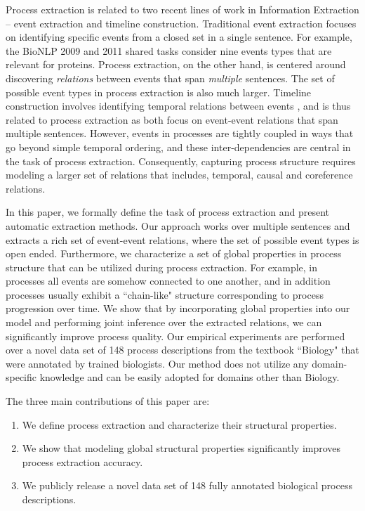 Process extraction is related to two recent lines of work in Information Extraction -- event extraction and timeline construction.
Traditional event extraction focuses on identifying specific events from a closed set in a single sentence. 
For example, the BioNLP 2009 and 2011 shared tasks \cite{kim09,kim11} consider nine events types that are relevant for proteins.
Process extraction, on the other hand, is centered around discovering \emph{relations} between events that span \emph{multiple} sentences. The set of possible event types in process extraction is also much larger. Timeline construction involves identifying temporal relations between events \cite{Chambers08,Yoshikawa09,Denis11,Do12,Mcclosky12}, and is thus related to process extraction as both focus on event-event relations that span multiple sentences. However, events in processes are tightly coupled in ways that go beyond simple temporal ordering, and these inter-dependencies are central in the task of process extraction. Consequently, capturing process structure requires modeling a larger set of relations that includes, temporal, causal and coreference relations.


In this paper, we formally define the task of process extraction and present automatic extraction methods. 
Our approach works over multiple sentences and extracts a rich set of event-event relations, where the set of possible event types is open ended. 
Furthermore, we characterize a set of global properties in process structure that can be utilized during process extraction. 
For example, in processes all events are somehow connected to one another, and in addition processes usually exhibit a ``chain-like" structure corresponding to process progression over time. 
We show that by incorporating global properties into our model and performing joint inference over the extracted relations, we can significantly improve process quality.  
Our empirical experiments are performed over a novel data set of 148 process descriptions from the textbook ``Biology" \cite{CampbellReece} that were annotated by trained biologists. Our method does not utilize any domain-specific knowledge and can be easily adopted for domains other than Biology.

The three main contributions of this paper are:
\begin{enumerate}[itemsep=0pt,topsep=0pt] 
\item We define process extraction and characterize their structural properties.
\item We show that modeling global structural properties significantly improves process extraction accuracy.
\item  We publicly release a novel data set of 148 fully annotated biological process descriptions.
\end{enumerate}

